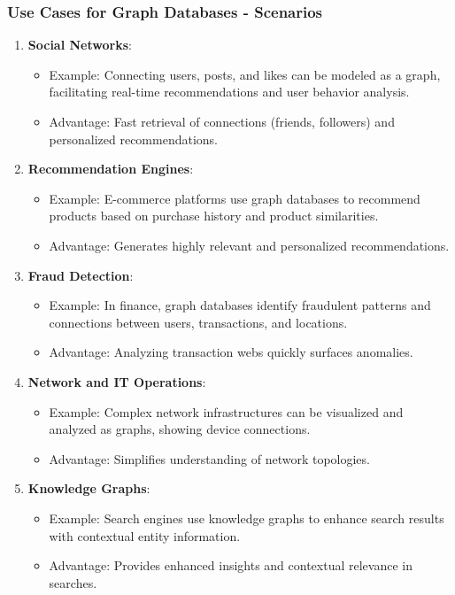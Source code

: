 \documentclass[aspectratio=169]{beamer}
\begin{document}
\begin{frame}[fragile]
    \frametitle{Use Cases for Graph Databases - Scenarios}
    \begin{enumerate}
        \item \textbf{Social Networks}:
        \begin{itemize}
            \item Example: Connecting users, posts, and likes can be modeled as a graph, facilitating real-time recommendations and user behavior analysis.
            \item Advantage: Fast retrieval of connections (friends, followers) and personalized recommendations.
        \end{itemize}
        
        \item \textbf{Recommendation Engines}:
        \begin{itemize}
            \item Example: E-commerce platforms use graph databases to recommend products based on purchase history and product similarities.
            \item Advantage: Generates highly relevant and personalized recommendations.
        \end{itemize}

        \item \textbf{Fraud Detection}:
        \begin{itemize}
            \item Example: In finance, graph databases identify fraudulent patterns and connections between users, transactions, and locations.
            \item Advantage: Analyzing transaction webs quickly surfaces anomalies.
        \end{itemize}

        \item \textbf{Network and IT Operations}:
        \begin{itemize}
            \item Example: Complex network infrastructures can be visualized and analyzed as graphs, showing device connections.
            \item Advantage: Simplifies understanding of network topologies.
        \end{itemize}
        
        \item \textbf{Knowledge Graphs}:
        \begin{itemize}
            \item Example: Search engines use knowledge graphs to enhance search results with contextual entity information.
            \item Advantage: Provides enhanced insights and contextual relevance in searches.
        \end{itemize}
    \end{enumerate}
\end{frame}
\end{document}
